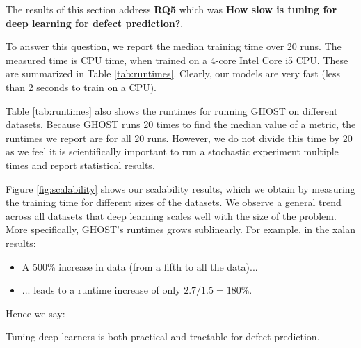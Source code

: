 \documentclass[10pt,compsoc,twocolumn]{IEEEtran}
\newcommand{\bi}{\begin{itemize}}
\newcommand{\ei}{\end{itemize}}
\begin{document}
The results of this section address \textbf{RQ5} which was \textbf{How slow is tuning for deep learning for defect prediction?}.

To answer this question, we report the median training time over 20 runs. The measured time is CPU time, when trained on a 4-core Intel Core i5 CPU. These are summarized in Table \ref{tab:runtimes}. Clearly, our models are very fast (less than 2 seconds to train on a CPU).

Table \ref{tab:runtimes} also shows the runtimes for running GHOST on different datasets. Because GHOST runs 20 times to find the median value of a metric, the runtimes we report are for all 20 runs. However, we do not divide this time by 20 as we feel it is scientifically important to run a stochastic experiment multiple times and report statistical results.

Figure \ref{fig:scalability} shows our scalability results, which we obtain by measuring the training time for different sizes of the datasets.
We observe a general trend across all datasets that deep learning scales well with the size of the problem. More specifically,  GHOST's runtimes grows sublinearly. For example, in the xalan results:
\bi
\item A 500\% increase in data   (from a fifth to all the data)...
\item ... leads to a runtime increase of   only    $2.7/1.5 = 180\%$.
\ei

Hence we say: 
\begin{blockquote}
    \noindent
    Tuning deep learners is both practical and tractable for defect prediction.
\end{blockquote}
\end{document}
